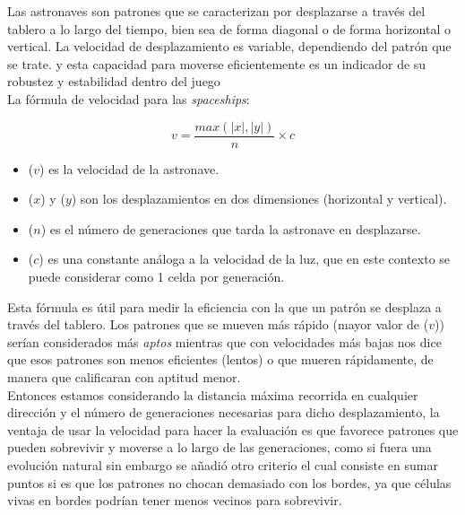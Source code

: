 Las astronaves \cite{spaceships} son patrones que se caracterizan por desplazarse a través 
del tablero a lo largo del tiempo, bien sea de forma diagonal o de forma horizontal o 
vertical. La velocidad de desplazamiento es variable, dependiendo del patrón que se trate.
y esta capacidad para moverse eficientemente es un indicador de su robustez y estabilidad 
dentro del juego\\ 

\noindent La fórmula de velocidad para las \textit{spaceships}:

\begin{equation*}
    v = \frac{max(|x|,|y|)}{n} \times c
\end{equation*}

\begin{itemize}
    \item[] ($v$) es la velocidad de la astronave.
    \item[] ($x$) y ($y$) son los desplazamientos en dos dimensiones (horizontal y vertical).
    \item[] ($n$) es el número de generaciones que tarda la astronave en desplazarse.
    \item[] ($c$) es una constante análoga a la velocidad de la luz, que en este contexto se 
    puede considerar como 1 celda por generación.
\end{itemize}

Esta fórmula es útil para medir la eficiencia con la que un patrón se desplaza a través del 
tablero. Los patrones que se mueven más rápido (mayor valor de ($v$)) serían considerados 
más \textit{aptos} mientras que con velocidades más bajas nos dice que esos patrones son menos
eficientes (lentos) o que mueren rápidamente, de manera que calificaran con aptitud menor.\\    


Entonces estamos considerando la distancia máxima recorrida en cualquier dirección y el 
número de generaciones necesarias para dicho desplazamiento, la ventaja de usar la velocidad
para hacer la evaluación es que favorece patrones que pueden sobrevivir y moverse a lo largo de 
las generaciones, como si fuera una evolución natural sin embargo se añadió otro criterio el 
cual consiste en sumar puntos si es que los patrones no chocan demasiado con los bordes, ya que 
células vivas en bordes podrían tener menos vecinos para sobrevivir. 